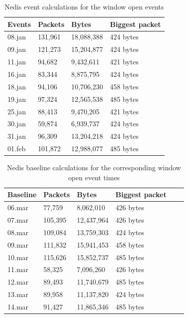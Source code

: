 \begin{table}[H]
\centering
    \caption{Nedis event calculations for the window open events}
\label{tab:NedisWindowCalculations}
    \begin{tabular}{|l|l|l|l|}
        \hline
        \textbf{Events} & \textbf{Packets} & \textbf{Bytes} & \textbf{Biggest packet} \\ \hline
        08.jan          & 131,961          & 18,088,388     & 424 bytes               \\ \hline
        09.jan          & 121,273          & 15,204,877     & 424 bytes               \\ \hline
        11.jan          & 94,682           & 9,432,611      & 421 bytes               \\ \hline
        16.jan          & 83,344           & 8,875,795      & 424 bytes               \\ \hline
        18.jan          & 94,106           & 10,706,230     & 458 bytes               \\ \hline
        19.jan          & 97,324           & 12,565,538     & 485 bytes               \\ \hline
        25.jan          & 88,413           & 9,470,205      & 421 bytes               \\ \hline
        30.jan          & 59,874           & 6,939,737      & 424 bytes               \\ \hline
        31.jan          & 96,309           & 13,204,218     & 424 bytes               \\ \hline
        01.feb          & 101,872          & 12,988,077     & 485 bytes               \\ \hline
    \end{tabular}
\end{table}

\begin{table}[H]
    \centering
    \caption{Nedis baseline calculations for the corresponding window open event times}
    \begin{tabular}{|l|l|l|l|l|l|}
    \hline
        \textbf{Baseline} & \textbf{Packets} & \textbf{Bytes} & \textbf{Biggest packet} \\ \hline
        06.mar & 77,759  & 8,062,010  & 426 bytes \\ \hline
        07.mar & 105,395 & 12,437,964 & 426 bytes \\ \hline
        08.mar & 109,084 & 13,759,303 & 424 bytes \\ \hline
        09.mar & 111,832 & 15,941,453 & 458 bytes \\ \hline
        10.mar & 115,626 & 15,852,737 & 485 bytes \\ \hline
        11.mar & 58,325  & 7,096,260  & 426 bytes \\ \hline
        12.mar & 89,493  & 11,740,679 & 485 bytes \\ \hline
        13.mar & 89,958  & 11,137,820 & 424 bytes \\ \hline
        14.mar & 91,427  & 11,865,346 & 485 bytes \\ \hline
    \end{tabular}
    \label{tab:NedisBaselineWindowCalculations}
\end{table}

